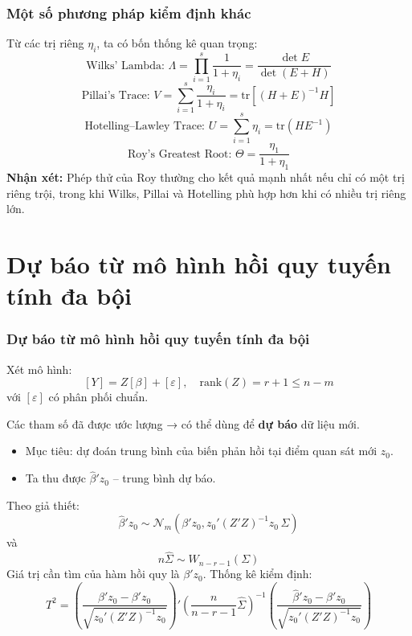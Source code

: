 \begin{frame}
\frametitle{Một số phương pháp kiểm định khác}

Từ các trị riêng $\eta_i$, ta có bốn thống kê quan trọng:
\[
\text{Wilks’ Lambda: } 
\Lambda = \prod_{i=1}^{s}\frac{1}{1 + \eta_i} = \frac{\det E}{\det(E + H)}
\]
\[
\text{Pillai’s Trace: } V = \sum_{i=1}^{s}\frac{\eta_i}{1 + \eta_i} = \mathrm{tr}[(H + E)^{-1}H]
\]
\[
\text{Hotelling–Lawley Trace: } U = \sum_{i=1}^{s}\eta_i = \mathrm{tr}(HE^{-1})
\]
\[
\text{Roy’s Greatest Root: } \Theta = \frac{\eta_1}{1 + \eta_1}
\]
\textbf{Nhận xét:}  
Phép thử của Roy thường cho kết quả mạnh nhất nếu chỉ có một trị riêng trội,  
trong khi Wilks, Pillai và Hotelling phù hợp hơn khi có nhiều trị riêng lớn.
\end{frame}


\section{Dự báo từ mô hình hồi quy tuyến tính đa bội}

\begin{frame}
\frametitle{Dự báo từ mô hình hồi quy tuyến tính đa bội}

Xét mô hình:
\[
[Y] = Z[\beta] + [\varepsilon], \quad \mathrm{rank}(Z) = r + 1 \le n - m
\]
với $[\varepsilon]$ có phân phối chuẩn.

Các tham số đã được ước lượng → có thể dùng để \textbf{dự báo} dữ liệu mới.

\begin{itemize}
    \item Mục tiêu: dự đoán trung bình của biến phản hồi tại điểm quan sát mới $z_0$.
    \item Ta thu được $\widehat{\beta}'z_0$ – trung bình dự báo.
\end{itemize}

Theo giả thiết:
\[
\widehat{\beta}'z_0 \sim \mathcal{N}_m(\beta' z_0, z_0'(Z'Z)^{-1}z_0\,\Sigma)
\]
và
\[
n\widehat{\Sigma} \sim W_{n - r - 1}(\Sigma)
\]
Giá trị cần tìm của hàm hồi quy là $\beta' z_0$.  
Thống kê kiểm định:
\[
T^2 = 
\left( 
\frac{\widehat{\beta}'z_0 - \beta' z_0}
{\sqrt{z_0'(Z'Z)^{-1}z_0}}
\right)'
\left(
\frac{n}{n - r - 1}\widehat{\Sigma}
\right)^{-1}
\left(
\frac{\widehat{\beta}'z_0 - \beta' z_0}
{\sqrt{z_0'(Z'Z)^{-1}z_0}}
\right)
\]
\end{frame}

